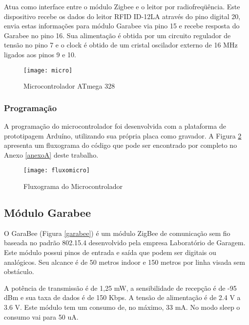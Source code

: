 \documentclass[tcc,capa]{texufpel}
\begin{document}
            Atua como interface entre o módulo Zigbee e o leitor por radiofreqüência. Este dispositivo recebe os dados do leitor RFID ID-12LA através do pino digital 20, envia estas informações para módulo Garabee via pino 15 e recebe resposta do Garabee no pino 16.
            Sua alimentação é obtida por um circuito regulador de tensão no pino 7 e o clock é obtido de um cristal oscilador externo de 16 MHz ligados aos pinos 9 e 10.
            
            
            \begin{figure}[H]
                \centering 
                \texttt{[image: micro]}
                \caption{Microcontrolador ATmega 328 \cite{instructables:2015:Online}} 
                \label{atmega}
            \end{figure}
            
            \subsubsection{Programação}
                
                 A programação do microcontrolador foi desenvolvida com a plataforma de prototipagem Arduíno, utilizando sua própria placa como gravador. A Figura \ref{micro} apresenta um fluxograma do código que pode ser encontrado por completo no Anexo \ref{anexoA} deste trabalho.
                 
                \begin{figure}[H]
                    \centering \texttt{[image: fluxomicro]}
                    \caption{Fluxograma do Microcontrolador} 
                    \label{micro}
                \end{figure}
     
        \subsection{Módulo Garabee}
        
            O GaraBee (Figura \ref{garabee}) é um módulo ZigBee de comunicação sem fio baseada no padrão 802.15.4 desenvolvido pela empresa Laboratório de Garagem. Este módulo possui pinos de entrada e saída que podem ser digitais ou analógicos. Seu alcance é de 50 metros indoor e 150 metros por linha visada sem obstáculo.
            
            A potência de transmissão é de 1,25 mW, a sensibilidade de recepção é de -95 dBm e sua taxa de dados é de 150 Kbps. A tensão de alimentação é de 2.4 V a 3.6 V. Este módulo tem um consumo de, no máximo, 33 mA. No modo sleep o consumo vai para  50 uA.
            
\end{document}
